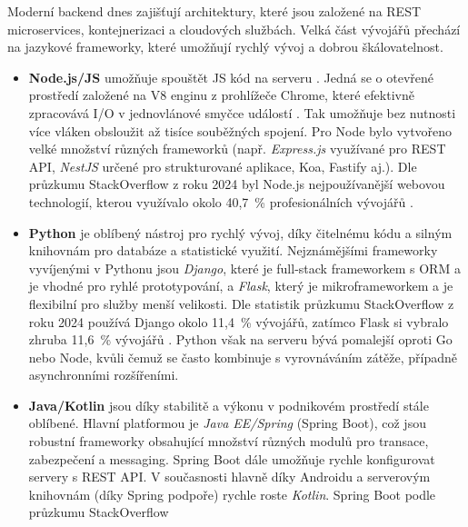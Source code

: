 Moderní backend dnes zajišťují architektury, které jsou založené na REST
microservices, kontejnerizaci a cloudových službách. Velká část vývojářů
přechází na jazykové frameworky, které umožňují rychlý vývoj a dobrou
škálovatelnost.

\begin{itemize}
    \item \textbf{Node.js/JS} umožňuje spouštět JS kód na serveru
        \cite{YHVfLHsNlUItkF6G, kbr6yxw1ew4wJS2e}. %
        Jedná se o otevřené prostředí založené na V8 enginu z prohlížeče
        Chrome, které efektivně zpracovává I/O v jednovlánové smyčce
        událostí \cite{YHVfLHsNlUItkF6G,kbr6yxw1ew4wJS2e}. %
        Tak umožňuje bez nutnosti více vláken obsloužit až tisíce
        souběžných spojení. Pro Node bylo vytvořeno velké množství
        různých frameworků (např. \emph{Express.js} využívané pro REST API,
        \emph{NestJS} určené pro strukturované aplikace, Koa, Fastify aj.).
        Dle průzkumu StackOverflow z roku 2024 byl Node.js nejpoužívanější
        webovou technologií, kterou využívalo okolo 40,7~\% profesionálních
        vývojářů \cite{YHVfLHsNlUItkF6G,w6F4OYb0neliWLGP}. %
    \item \textbf{Python} je oblíbený nástroj pro rychlý vývoj, díky
        čitelnému kódu a silným knihovnám pro databáze a statistické
        využití. Nejznámějšími frameworky vyvíjenými v Pythonu jsou
        \emph{Django}, které je full-stack frameworkem s ORM a je vhodné
        pro ryhlé prototypování, a \emph{Flask}, který je mikroframeworkem
        a je flexibilní pro služby menší velikosti. Dle statistik průzkumu
        StackOverflow z roku 2024 používá Django okolo 11,4~\% vývojářů,
        zatímco Flask si vybralo zhruba 11,6~\% vývojářů
        \cite{YHVfLHsNlUItkF6G,w6F4OYb0neliWLGP}. %
        Python však na serveru bývá pomalejší oproti Go nebo Node, kvůli
        čemuž se často kombinuje s vyrovnáváním zátěže, případně
        asynchronními rozšířeními.
    \item \textbf{Java/Kotlin} jsou díky stabilitě a výkonu v podnikovém
        prostředí stále oblíbené. Hlavní platformou je \emph{Java EE/Spring}
        (Spring Boot), což jsou robustní frameworky obsahující množství
        různých modulů pro transace, zabezpečení a messaging. Spring Boot
        dále umožňuje rychle konfigurovat servery s REST API. V současnosti
        hlavně díky Androidu a serverovým knihovnám (díky Spring podpoře)
        rychle roste \emph{Kotlin}. Spring Boot podle průzkumu StackOverflow

\end{itemize}
